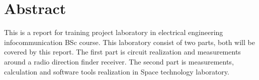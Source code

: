 \documentclass[
11pt, %
a4paper, %
oneside, %
headinclude,footinclude, %
BCOR5mm, %
]{scrartcl}
\title{\normalfont\spacedallcaps{Training Project Laboratory Report}} %
\author{\spacedlowsmallcaps{Qianhao Zhang - CP4IRF}} %
\date{} %
\begin{document}

\renewcommand{\sectionmark}[1]{\markright{\spacedlowsmallcaps{#1}}} %
\lehead{\mbox{\llap{\small\thepage\kern1em\color{halfgray} \vline}\color{halfgray}\hspace{0.5em}\rightmark\hfil}} %

\pagestyle{scrheadings} %


\maketitle %

\setcounter{tocdepth}{2} %

\tableofcontents %

\listoffigures %

\listoftables %


\section*{Abstract} %

This is a report for training project laboratory in electrical engineering infocommunication BSc course.
This laboratory consist of two parts, both will be covered by this report.
The first part is circuit realization and measurements around a radio direction 
finder receiver.
The second part is measurements, calculation and software tools realization in Space technology laboratory.
\end{document}
